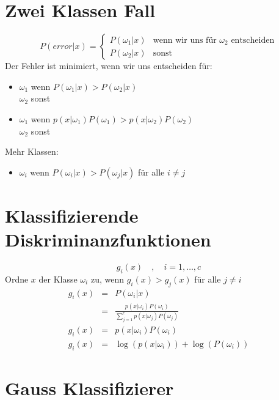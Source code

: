 \section{Zwei Klassen Fall}

$$P(error | x) = \left\{ \begin{array}{cl} P(\omega_1 | x) & \textrm{wenn wir uns für } \omega_2 \textrm{ entscheiden} \\ P(\omega_2 | x) & \textrm{sonst} \end{array} \right.$$
Der Fehler ist minimiert, wenn wir uns entscheiden für:
\begin{itemize}
\item $\omega_1$ wenn $P(\omega_1 | x) > P(\omega_2 | x)$ \\ $\omega_2$ sonst
\item $\omega_1$ wenn $p(x | \omega_1)P(\omega_1) > p(x | \omega_2)P(\omega_2)$ \\ $\omega_2$ sonst
\end{itemize}
Mehr Klassen:
\begin{itemize}
\item $\omega_i$ wenn $P(\omega_i | x) > P(\omega_j | x)$ für alle $i \not= j$
\end{itemize}

\section{Klassifizierende Diskriminanzfunktionen}

$$g_i(x) \quad , \quad i = 1, \dots, c$$
Ordne $x$ der Klasse $\omega_i$ zu, wenn $g_i(x) > g_j(x)$ für alle $j \not= i$
\begin{eqnarray*}
g_i(x) &=& P(\omega_i | x) \\ &=& \frac{p(x | \omega_i) P(\omega_i)}{\sum\limits_{j=1}^c p(x | \omega_j)P(\omega_j)} \\ g_i(x) &=& p(x | \omega_i) P(\omega_i) \\
g_i(x) &=& \log(p(x | \omega_i)) + \log(P(\omega_i))
\end{eqnarray*}

\section{Gauss Klassifizierer}

